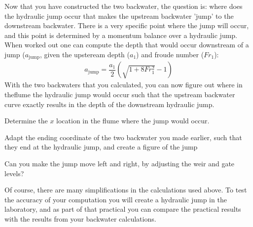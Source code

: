 \documentclass[a4paper]{article}
\begin{document}
Now that you have constructed the two backwater, the question is: where does the hydraulic jump occur that makes the upstream backwater 'jump' to the downstream backwater. There is a very specific point where the jump will occur, and this point is determined by a momentum balance over a hydraulic jump. When worked out one can compute the depth  that would occur downstream of a jump ($a_\text{jump}$, given the upsteream depth ($a_1$) and froude number ($Fr_1$):
\begin{align*}
  a_\text{jump}=\dfrac{a_1}{2}(\sqrt{1+8Fr_1^2}-1)
\end{align*}
With the two backwaters that you calculated, you can now figure out where in theflume the hydraulic jump would occur such that the upstream backwater curve exactly results in the depth of the downstream hydraulic jump.

\begin{exercise}
  Determine the $x$ location in the flume where the jump would occur.
\end{exercise}

\begin{exercise}
  Adapt the ending coordinate of the two backwater you made earlier, such that they end at the hydraulic jump, and create a figure of the jump
\end{exercise}

\begin{exercise}
  Can you make the jump move left and right, by adjusting the weir and gate levels?
\end{exercise}

Of course, there are many simplifications in the calculations used above. To test the accuracy of your computation you will create a hydraulic jump in the laboratory, and as part of that practical you can compare the practical results with the results from your backwater calculations.

\printsolutions
\end{document}
